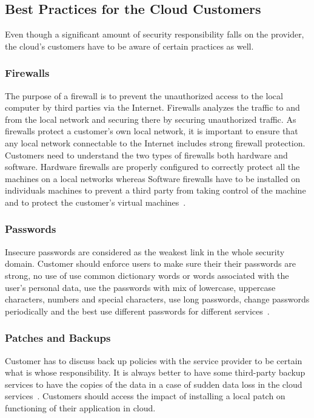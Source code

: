 \subsection{Best Practices for the Cloud Customers}
Even though a significant amount of security responsibility falls on the 
provider, the cloud's customers have to be aware of certain practices as well.

\subsubsection{Firewalls}
The purpose of a firewall is to prevent the unauthorized access to the local 
computer by third parties via the Internet. Firewalls analyzes the traffic to 
and from the local network and securing there by securing unauthorized traffic.
As firewalls protect a customer's own local network, it is important to ensure
that any local network connectable to the Internet includes strong firewall 
protection. Customers need to understand the two types of firewalls both 
hardware and software. Hardware firewalls are properly configured to 
correctly protect all the machines on a local networks whereas Software 
firewalls have to be installed on individuals machines to prevent a third 
party from taking control of the machine and to protect the customer's 
virtual machines~\cite{hid-sp18-513-diversity}.

\subsubsection{Passwords}
Insecure passwords are considered as the weakest link in the whole
security domain. Customer should enforce users to make sure their 
their passwords are strong, no use of use common dictionary words 
or words associated with the user's personal data, use the passwords
with mix of lowercase, uppercase characters, numbers and special 
characters, use long passwords, change passwords periodically 
and the best use different passwords for different 
services~\cite{hid-sp18-513-redpaper}.

\subsubsection{Patches and Backups}
Customer has to discuss back up policies with the service provider 
to be certain what is whose responsibility. It is always better to 
have some third-party backup services to have the copies of the 
data in a case of sudden data loss in the cloud 
services~\cite{hid-sp18-513-diversity}. Customers should access
the impact of installing a local patch on functioning of their
application in cloud.

